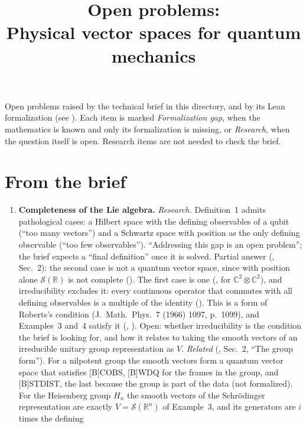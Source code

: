 \documentclass[11pt]{article}
\title{Open problems:\\ Physical vector spaces for quantum mechanics}
\author{}
\date{}
\begin{document}
\maketitle

\noindent
Open problems raised by the technical brief in this directory, and by its Lean formalization
(see ). Each item is marked \emph{Formalization gap}, when the mathematics is known and only its
formalization is missing, or \emph{Research}, when the question itself is open.
Research items are not needed to check the brief.

\section*{From the brief}
\begin{enumerate}
\item \textbf{Completeness of the Lie algebra.} \emph{Research.} Definition~1
  admits pathological cases: a Hilbert space with the defining observables of a qubit (``too many
  vectors'') and a Schwartz space with position as the only defining observable (``too few
  observables''). ``Addressing this gap is an open problem''; the brief expects a ``final
  definition'' once it is solved.
  Partial answer (, Sec.~2): the second case is not a quantum vector
  space, since with position alone $\mathcal{S}(\mathbb{R})$ is not complete
  (). The first case is one
  (, for $\mathbb{C}^2 \otimes \mathbb{C}^2$),
  and irreducibility excludes it: every continuous operator that commutes with all defining
  observables is a multiple of the identity ().
  This is a form of Roberts's condition (J.\ Math.\ Phys.\ 7 (1966) 1097, p.~1099), and
  Examples~3 and~4 satisfy it (,
  ). Open: whether irreducibility is the condition
  the brief is looking for, and how it relates to taking the smooth vectors of an irreducible
  unitary group representation as $V$.
  \emph{Related} (, Sec.~2, ``The group form''). For a nilpotent group
  the smooth vectors form a quantum vector space that satisfies [B]COBS, [B]WDQ for the frames
  in the group, and [B]STDIST, the last because the group is part of the data (not formalized).
  For the Heisenberg group $H_n$ the smooth vectors of the Schr\"odinger representation are
  exactly $V = \mathcal S(\mathbb R^n)$ of Example~3, and its generators are $i$ times the defining

\end{enumerate}
\end{document}
